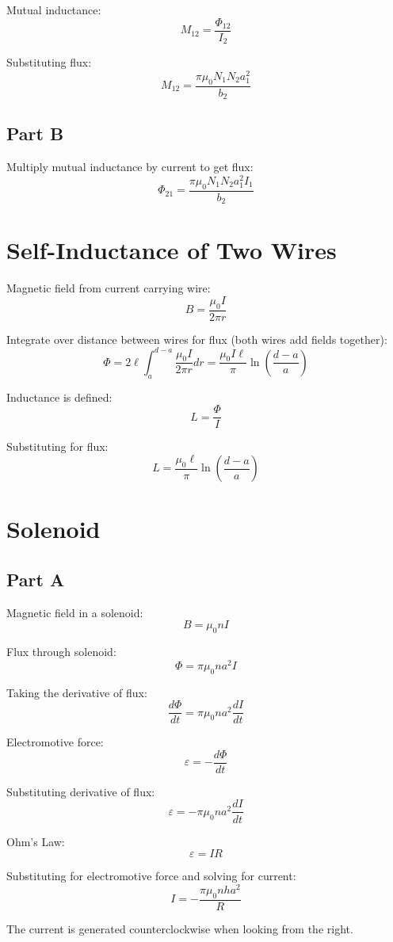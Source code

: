\documentclass{article}
\begin{document}
Mutual inductance:
$$ M_{12} = \frac{\Phi_{12}}{I_2} $$

Substituting flux:
$$ M_{12} = \frac{\pi \mu_0 N_1 N_2 a_1^2}{b_2} $$

\subsection*{Part B}

Multiply mutual inductance by current to get flux:
$$ \Phi_{21} = \frac{\pi \mu_0 N_1 N_2 a_1^2 I_1}{b_2} $$

\section{Self-Inductance of Two Wires}

Magnetic field from current carrying wire:
$$ B = \frac{\mu_0 I}{2 \pi r} $$

Integrate over distance between wires for flux (both wires add fields together):
$$ \Phi = 2 \ell \int_a^{d-a} \frac{\mu_0 I}{2 \pi r} dr = \frac{\mu_0 I
\ell}{\pi} \ln\left(\frac{d - a}{a}\right) $$

Inductance is defined:
$$ L = \frac{\Phi}{I} $$

Substituting for flux:
$$ L = \frac{\mu_0 \ell}{\pi} \ln\left(\frac{d - a}{a}\right) $$

\section{Solenoid}

\subsection*{Part A}

Magnetic field in a solenoid:
$$ B = \mu_0 n I $$

Flux through solenoid:
$$ \Phi = \pi \mu_0 n a^2 I $$

Taking the derivative of flux:
$$ \frac{d\Phi}{dt} = \pi \mu_0 n a^2 \frac{dI}{dt} $$

Electromotive force:
$$ \varepsilon = -\frac{d\Phi}{dt} $$

Substituting derivative of flux:
$$ \varepsilon = -\pi \mu_0 n a^2 \frac{dI}{dt} $$

Ohm's Law:
$$ \varepsilon = IR $$

Substituting for electromotive force and solving for current:
$$ I = -\frac{\pi \mu_0 n h a^2}{R} $$

The current is generated counterclockwise when looking from the right.
\end{document}

